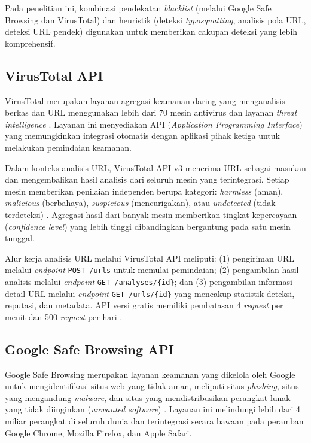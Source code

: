 \documentclass[conference]{IEEEtran}
\begin{document}
Pada penelitian ini, kombinasi pendekatan \textit{blacklist} (melalui Google Safe Browsing dan VirusTotal) dan heuristik (deteksi \textit{typosquatting}, analisis pola URL, deteksi URL pendek) digunakan untuk memberikan cakupan deteksi yang lebih komprehensif.

\subsection{VirusTotal API}

VirusTotal merupakan layanan agregasi keamanan daring yang menganalisis berkas dan URL menggunakan lebih dari 70 mesin antivirus dan layanan \textit{threat intelligence} \cite{virustotal_api}. Layanan ini menyediakan API (\textit{Application Programming Interface}) yang memungkinkan integrasi otomatis dengan aplikasi pihak ketiga untuk melakukan pemindaian keamanan.

Dalam konteks analisis URL, VirusTotal API v3 menerima URL sebagai masukan dan mengembalikan hasil analisis dari seluruh mesin yang terintegrasi. Setiap mesin memberikan penilaian independen berupa kategori: \textit{harmless} (aman), \textit{malicious} (berbahaya), \textit{suspicious} (mencurigakan), atau \textit{undetected} (tidak terdeteksi) \cite{virustotal_api}. Agregasi hasil dari banyak mesin memberikan tingkat kepercayaan (\textit{confidence level}) yang lebih tinggi dibandingkan bergantung pada satu mesin tunggal.

Alur kerja analisis URL melalui VirusTotal API meliputi: (1) pengiriman URL melalui \textit{endpoint} \texttt{POST /urls} untuk memulai pemindaian; (2) pengambilan hasil analisis melalui \textit{endpoint} \texttt{GET /analyses/\{id\}}; dan (3) pengambilan informasi detail URL melalui \textit{endpoint} \texttt{GET /urls/\{id\}} yang mencakup statistik deteksi, reputasi, dan metadata. API versi gratis memiliki pembatasan 4 \textit{request} per menit dan 500 \textit{request} per hari \cite{virustotal_api}.

\subsection{Google Safe Browsing API}

Google Safe Browsing merupakan layanan keamanan yang dikelola oleh Google untuk mengidentifikasi situs web yang tidak aman, meliputi situs \textit{phishing}, situs yang mengandung \textit{malware}, dan situs yang mendistribusikan perangkat lunak yang tidak diinginkan (\textit{unwanted software}) \cite{google_safebrowsing}. Layanan ini melindungi lebih dari 4 miliar perangkat di seluruh dunia dan terintegrasi secara bawaan pada peramban Google Chrome, Mozilla Firefox, dan Apple Safari.
\end{document}
